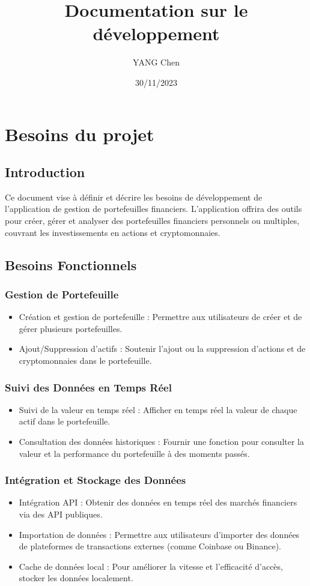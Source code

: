 \documentclass{article}
\title{Documentation sur le développement}
\date{30/11/2023}
\author{YANG Chen}
\begin{document}
\maketitle
\tableofcontents
\newpage


\section{Besoins du projet}
\subsection{Introduction}
Ce document vise à définir et décrire les besoins de développement de l'application de gestion de portefeuilles financiers. L'application offrira des outils pour créer, gérer et analyser des portefeuilles financiers personnels ou multiples, couvrant les investissements en actions et cryptomonnaies.

\subsection{Besoins Fonctionnels}
\subsubsection{Gestion de Portefeuille}
\begin{itemize}
    \item Création et gestion de portefeuille : Permettre aux utilisateurs de créer et de gérer plusieurs portefeuilles.
    \item Ajout/Suppression d'actifs : Soutenir l'ajout ou la suppression d'actions et de cryptomonnaies dans le portefeuille.
\end{itemize}

\subsubsection{Suivi des Données en Temps Réel}
\begin{itemize}
    \item Suivi de la valeur en temps réel : Afficher en temps réel la valeur de chaque actif dans le portefeuille.
    \item Consultation des données historiques : Fournir une fonction pour consulter la valeur et la performance du portefeuille à des moments passés.
\end{itemize}

\subsubsection{Intégration et Stockage des Données}
\begin{itemize}
    \item Intégration API : Obtenir des données en temps réel des marchés financiers via des API publiques.
    \item Importation de données : Permettre aux utilisateurs d'importer des données de plateformes de transactions externes (comme Coinbase ou Binance).
    \item Cache de données local : Pour améliorer la vitesse et l'efficacité d'accès, stocker les données localement.
\end{itemize}
\end{document}
